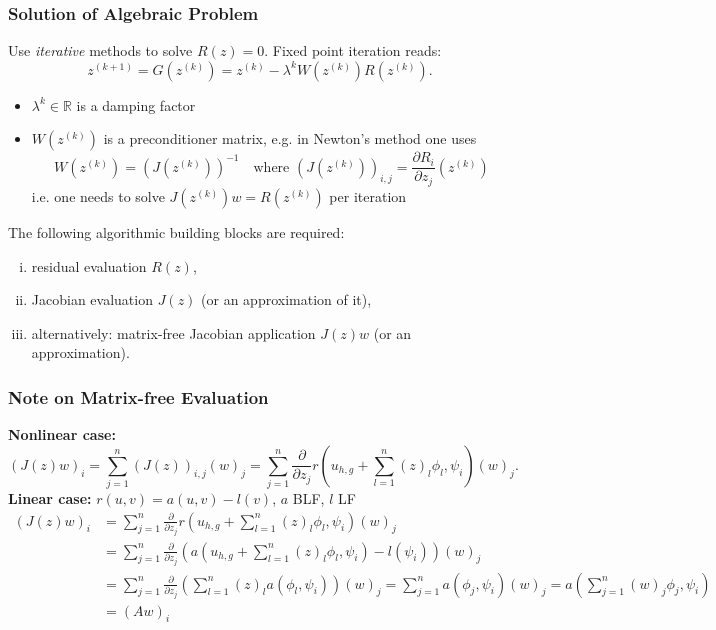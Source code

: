 \documentclass[aspectratio=169,11pt]{beamer}
\theoremstyle{definition}
\begin{document}
\begin{frame}
\frametitle{Solution of Algebraic Problem}
Use {\em iterative} methods to solve $R(z)=0$. Fixed point iteration reads:
\begin{equation}
z^{(k+1)} = G(z^{(k)}) = z^{(k)} - \lambda^{k} W(z^{(k)}) R(z^{(k)}) .
\end{equation}
\vspace{-5mm}
\begin{itemize}
\item $\lambda^{k}\in\mathbb{R}$ is a damping factor
\item $W(z^{(k)})$ is a preconditioner matrix, e.g. in Newton's method one uses
\begin{equation*}
W(z^{(k)}) = (J(z^{(k)}))^{-1} \quad \text{where $(J(z^{(k)}))_{i,j} = \frac{\partial R_i}{\partial z_j}
(z^{(k)})$}
\end{equation*}
i.e. one needs to solve $J\left(z^{(k)}\right) w = R(z^{(k)})$ per iteration
\end{itemize}
The following algorithmic building blocks are required:
\begin{enumerate}[i)]
\item residual evaluation $R(z)$,
\item Jacobian evaluation $J(z)$ (or an approximation of it),
\item alternatively: matrix-free Jacobian application $J(z) w$ (or an approximation).
\end{enumerate}
\end{frame}

\begin{frame}
\frametitle{Note on Matrix-free Evaluation}
\textbf{Nonlinear case:}
\begin{equation*}
(J(z) w)_i = \sum_{j=1}^n (J(z))_{i,j} (w)_j = \sum_{j=1}^n
\frac{\partial}{\partial z_j} r\left(u_{h,g}+\sum_{l=1}^n (z)_l  \phi_l,\psi_i\right) (w)_j .
\end{equation*}
\textbf{Linear case:} $r(u,v)=a(u,v)-l(v)$, $a$ BLF, $l$ LF
\begin{equation*}
\begin{split}
(J(z) w)_i &= \sum_{j=1}^n
\frac{\partial}{\partial z_j} r\left(u_{h,g}+\sum_{l=1}^n (z)_l  \phi_l,\psi_i\right) (w)_j \\
&= \sum_{j=1}^n \frac{\partial}{\partial z_j} \left(
a\left(u_{h,g}+\sum_{l=1}^n (z)_l  \phi_l,\psi_i\right) - l(\psi_i)\right) (w)_j \\
&= \sum_{j=1}^n \frac{\partial}{\partial z_j} \left(
\sum_{l=1}^n (z)_l a(\phi_l,\psi_i) \right)  (w)_j 
= \sum_{j=1}^n a(\phi_j,\psi_i) (w)_j =
a\left( \sum_{j=1}^n (w)_j \phi_j,\psi_i\right) \\
&= (A w)_i
\end{split}
\end{equation*}
\end{frame}
\end{document}
